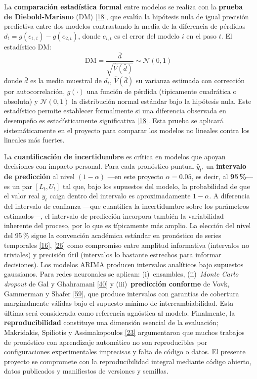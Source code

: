 \documentclass[12pt,letterpaper]{report}
\newcommand{\cita}[1]{\hyperref[bib:#1]{[#1]}}
\begin{document}
La \textbf{comparación estadística formal} entre modelos se realiza con la \textbf{prueba de Diebold-Mariano} (DM) \cita{18}, que evalúa la hipótesis nula de igual precisión predictiva entre dos modelos contrastando la media de la diferencia de pérdidas $d_t = g(e_{1,t}) - g(e_{2,t})$, donde $e_{i,t}$ es el error del modelo $i$ en el paso $t$. El estadístico DM:
\begin{equation}
    \text{DM} = \frac{\bar{d}}{\sqrt{\hat{V}(\bar{d})}} \sim \mathcal{N}(0,1)
\end{equation}
donde $\bar{d}$ es la media muestral de $d_t$, $\hat{V}(\bar{d})$ su varianza estimada con corrección por autocorrelación, $g(\cdot)$ una función de pérdida (típicamente cuadrática o absoluta) y $\mathcal{N}(0,1)$ la distribución normal estándar bajo la hipótesis nula. Este estadístico permite establecer formalmente si una diferencia observada en desempeño es estadísticamente significativa \cita{18}. Esta prueba se aplicará sistemáticamente en el proyecto para comparar los modelos no lineales contra los lineales más fuertes.

La \textbf{cuantificación de incertidumbre} es crítica en modelos que apoyan decisiones con impacto personal. Para cada pronóstico puntual $\hat{y}_t$, un \textbf{intervalo de predicción} al nivel $(1-\alpha)$ ---en este proyecto $\alpha = 0{.}05$, es decir, al \textbf{95\,\%}--- es un par $[L_t, U_t]$ tal que, bajo los supuestos del modelo, la probabilidad de que el valor real $y_t$ caiga dentro del intervalo es aproximadamente $1-\alpha$. A diferencia del intervalo de confianza ---que cuantifica la incertidumbre sobre los parámetros estimados---, el intervalo de predicción incorpora también la variabilidad inherente del proceso, por lo que es típicamente más amplio. La elección del nivel del 95\,\% sigue la convención académica estándar en pronóstico de series temporales \cita{16}, \cita{26} como compromiso entre amplitud informativa (intervalos no triviales) y precisión útil (intervalos lo bastante estrechos para informar decisiones). Los modelos ARIMA producen intervalos analíticos bajo supuestos gaussianos. Para redes neuronales se aplican: (i)~ensambles, (ii)~\textit{Monte Carlo dropout} de Gal y Ghahramani \cita{40} y (iii)~\textbf{predicción conforme} de Vovk, Gammerman y Shafer \cita{59}, que produce intervalos con garantías de cobertura marginalmente válidas bajo el supuesto mínimo de intercambiabilidad. Esta última será considerada como referencia agnóstica al modelo. Finalmente, la \textbf{reproducibilidad} constituye una dimensión esencial de la evaluación; Makridakis, Spiliotis y Assimakopoulos \cita{23} argumentaron que muchos trabajos de pronóstico con aprendizaje automático no son reproducibles por configuraciones experimentales imprecisas y falta de código o datos. El presente proyecto se compromete con la reproducibilidad integral mediante código abierto, datos publicados y manifiestos de versiones y semillas.
\end{document}
